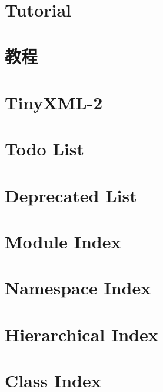 \documentclass[twoside]{book}
\newcommand{\+}{\discretionary{\mbox{\scriptsize$\hookleftarrow$}}{}{}}
\begin{document}
\chapter{Tutorial}
\label{md_C:_Users_Bilal_Itani_Desktop_inf2990-11_Cadriciel_Commun_Externe_RapidJSON_doc_tutorial}
\hypertarget{md_C:_Users_Bilal_Itani_Desktop_inf2990-11_Cadriciel_Commun_Externe_RapidJSON_doc_tutorial}{}

\chapter{教程}
\label{md_C:_Users_Bilal_Itani_Desktop_inf2990-11_Cadriciel_Commun_Externe_RapidJSON_doc_tutorial.zh-cn}
\hypertarget{md_C:_Users_Bilal_Itani_Desktop_inf2990-11_Cadriciel_Commun_Externe_RapidJSON_doc_tutorial.zh-cn}{}

\chapter{Tiny\+X\+M\+L-\/2}
\label{md_C:_Users_Bilal_Itani_Desktop_inf2990-11_Cadriciel_Commun_Externe_tinyxml2_readme}
\hypertarget{md_C:_Users_Bilal_Itani_Desktop_inf2990-11_Cadriciel_Commun_Externe_tinyxml2_readme}{}

\chapter{Todo List}
\label{todo}
\hypertarget{todo}{}

\chapter{Deprecated List}
\label{deprecated}
\hypertarget{deprecated}{}

\chapter{Module Index}

\chapter{Namespace Index}

\chapter{Hierarchical Index}

\chapter{Class Index}

\end{document}
